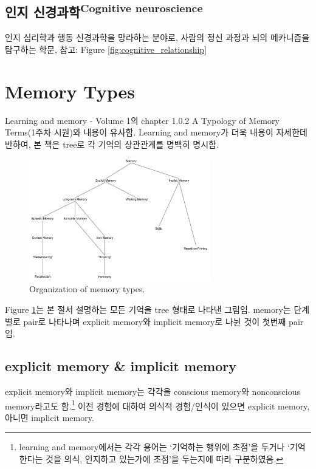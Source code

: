 \documentclass[../note.tex]{subfiles}
\begin{document}
\subsection{인지 신경과학\textsuperscript{Cognitive neuroscience}}
인지 심리학과 행동 신경과학을 망라하는 분야로, 사람의 정신 과정과 뇌의 메카니즘을 탐구하는 학문, 참고: Figure \ref{fig:cognitive_relationship}


\section{Memory Types}
Learning and memory - Volume 1의 chapter 1.0.2 A Typology of Memory Terms(1주차 시원)와 내용이 유사함.
Learning and memory가 더욱 내용이 자세한데 반하여, 본 책은 tree로 각 기억의 상관관계를 명백히 명시함.

\begin{figure}[h]
  \centering
  \includegraphics[width=0.7\textwidth]{image/memory_tree}
  \caption{Organization of memory types.}
  \label{fig:memory_tree}
\end{figure}

Figure \ref{fig:memory_tree}는 본 절서 설명하는 모든 기억을 tree 형태로 나타낸 그림임.
memory는 단계별로 pair로 나타나며 explicit memory와 implicit memory로 나뉜 것이 첫번째 pair임.

\subsection{explicit memory \& implicit memory}
explicit memory와 implicit memory는 각각을 conscious memory와 nonconscious memory라고도 함.\footnote{
  learning and memory에서는 각각 용어는 `기억하는 행위에 초점'을 두거나 `기억한다는 것을 의식, 인지하고 있는가에 초점'을 두는지에 따라 구분하였음.
}
이전 경험에 대하여 의식적 경험/인식이 있으면 explicit memory, 아니면 implicit memory.
\end{document}
